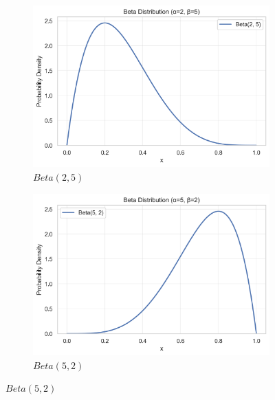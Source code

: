 \documentclass{article}
\begin{document}
\begin{figure}[H]
    \centering
    \begin{subfigure}{0.3\textwidth}
        \centering
        \includegraphics[width=\textwidth]{beta_distribution1.png}
        \caption{$Beta(2, 5)$}
        \label{a}
    \end{subfigure}
    \hspace{0.05\textwidth} %
    \begin{subfigure}{0.3\textwidth}
        \centering
        \includegraphics[width=\textwidth]{beta_distribution2.png}
        \caption{ $Beta(5, 2)$}
        \label{b}
    \end{subfigure}
    \label{fig:beta_comparison}
\end{figure}
\end{document}

